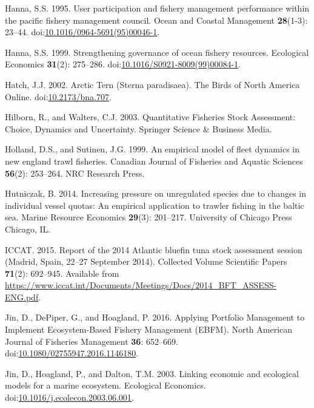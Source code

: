 \documentclass[]{article}
\begin{document}
\hypertarget{ref-Hanna1995UserCouncil}{}
Hanna, S.S. 1995. User participation and fishery management performance
within the pacific fishery management council. Ocean and Coastal
Management \textbf{28}(1-3): 23--44.
doi:\href{https://doi.org/10.1016/0964-5691(95)00046-1}{10.1016/0964-5691(95)00046-1}.

\hypertarget{ref-Hanna1999StrengtheningResources}{}
Hanna, S.S. 1999. Strengthening governance of ocean fishery resources.
Ecological Economics \textbf{31}(2): 275--286.
doi:\href{https://doi.org/10.1016/S0921-8009(99)00084-1}{10.1016/S0921-8009(99)00084-1}.

\hypertarget{ref-hatch_arctic_2002}{}
Hatch, J.J. 2002. Arctic Tern (Sterna paradisaea). The Birds of North
America Online.
doi:\href{https://doi.org/10.2173/bna.707}{10.2173/bna.707}.

\hypertarget{ref-hilborn_quantitative_2003}{}
Hilborn, R., and Walters, C.J. 2003. Quantitative Fisheries Stock
Assessment: Choice, Dynamics and Uncertainty. Springer Science \&
Business Media.

\hypertarget{ref-holland1999empirical}{}
Holland, D.S., and Sutinen, J.G. 1999. An empirical model of fleet
dynamics in new england trawl fisheries. Canadian Journal of Fisheries
and Aquatic Sciences \textbf{56}(2): 253--264. NRC Research Press.

\hypertarget{ref-hutniczak2014increasing}{}
Hutniczak, B. 2014. Increasing pressure on unregulated species due to
changes in individual vessel quotas: An empirical application to trawler
fishing in the baltic sea. Marine Resource Economics \textbf{29}(3):
201--217. University of Chicago Press Chicago, IL.

\hypertarget{ref-iccat_report_2015}{}
ICCAT. 2015. Report of the 2014 Atlantic bluefin tuna stock assessment
session (Madrid, Spain, 22--27 September 2014). Collected Volume
Scientific Papers \textbf{71}(2): 692--945. Available from
\url{https://www.iccat.int/Documents/Meetings/Docs/2014_BFT_ASSESS-ENG.pdf}.

\hypertarget{ref-Jin2016ApplyingEBFM}{}
Jin, D., DePiper, G., and Hoagland, P. 2016. Applying Portfolio
Management to Implement Ecosystem-Based Fishery Management (EBFM). North
American Journal of Fisheries Management \textbf{36}: 652--669.
doi:\href{https://doi.org/10.1080/02755947.2016.1146180}{10.1080/02755947.2016.1146180}.

\hypertarget{ref-Jin2003LinkingEcosystem}{}
Jin, D., Hoagland, P., and Dalton, T.M. 2003. Linking economic and
ecological models for a marine ecosystem. Ecological Economics.
doi:\href{https://doi.org/10.1016/j.ecolecon.2003.06.001}{10.1016/j.ecolecon.2003.06.001}.
\end{document}
